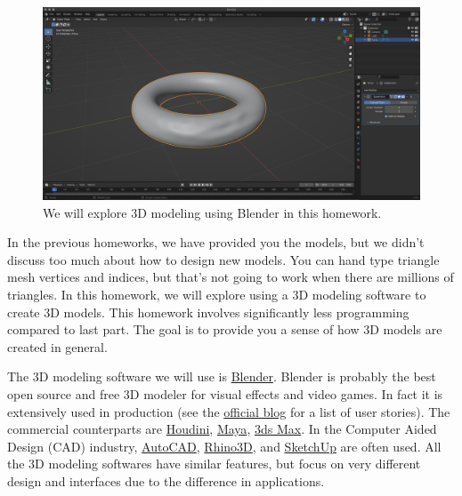 




\begin{figure}[h]
    \centering
    \includegraphics[width=0.5\linewidth]{imgs/hw_4.png}
    \caption{We will explore 3D modeling using Blender in this homework.}
    \label{fig:teaser}
\end{figure}

In the previous homeworks, we have provided you the models, but we didn't discuss too much about how to design new models. You can hand type triangle mesh vertices and indices, but that's not going to work when there are millions of triangles. In this homework, we will explore using a 3D modeling software to create 3D models. This homework involves significantly less programming compared to last part. The goal is to provide you a sense of how 3D models are created in general.

The 3D modeling software we will use is \href{https://www.blender.org/}{Blender}. Blender is probably the best open source and free 3D modeler for visual effects and video games. In fact it is extensively used in production (see the \href{https://www.blender.org/get-involved/user-stories/}{official blog} for a list of user stories). The commercial counterparts are \href{https://www.sidefx.com/products/houdini/}{Houdini}, \href{https://www.autodesk.com/products/maya/overview}{Maya}, \href{https://www.autodesk.com/products/3ds-max/overview}{3ds Max}. In the Computer Aided Design (CAD) industry, \href{https://en.wikipedia.org/wiki/AutoCAD}{AutoCAD}, \href{https://www.rhino3d.com/}{Rhino3D}, and \href{https://www.sketchup.com/}{SketchUp} are often used. All the 3D modeling softwares have similar features, but focus on very different design and interfaces due to the difference in applications.


